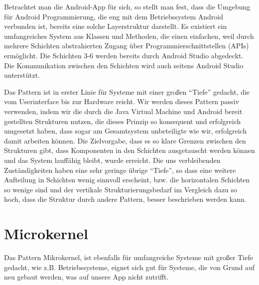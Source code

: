\documentclass{scrreprt}
\begin{document}
Betrachtet man die Android-App für sich, so stellt man fest, dass die Umgebung für Android Programmierung, die eng mit dem Betriebssystem Android verbunden ist, bereits eine solche Layerstruktur darstellt. Es existiert ein umfangreiches System aus Klassen und Methoden, die einen einfachen, weil durch mehrere Schichten abstrahierten Zugang über Programmierschnittstellen (APIs) ermöglicht. Die Schichten 3-6 werden bereits durch Android Studio abgedeckt. Die Kommunikation zwischen den Schichten wird auch seitens Android Studio unterstützt.

Das Pattern ist in erster Linie für Systeme mit einer großen “Tiefe” gedacht, die vom Userinterface bis zur Hardware reicht. Wir werden dieses Pattern passiv verwenden, indem wir die durch die Java Virtual Machine und Android bereit gestellten Strukturen nutzen, die dieses Prinzip so konsequent und erfolgreich umgesetzt haben, dass sogar am Gesamtsystem unbeteiligte wie wir, erfolgreich damit arbeiten können. Die Zielvorgabe, dass es so klare Grenzen zwischen den Strukturen gibt, dass Komponenten in den Schichten ausgetauscht werden können und das System lauffähig bleibt, wurde erreicht.
Die uns verbleibenden Zuständigkeiten haben eine sehr geringe übrige “Tiefe”, so dass eine weitere Aufteilung in Schichten wenig sinnvoll erscheint, bzw. die horizontalen Schichten so wenige sind und der vertikale Strukturierungsbedarf im Vergleich dazu so hoch, dass die Struktur durch andere Pattern, besser beschrieben werden kann.

\chapter{Microkernel}

Das Pattern Mikrokernel, ist ebenfalls für umfangreiche Systeme mit großer Tiefe gedacht, wie z.B. Betriebssysteme, eignet sich gut für Systeme, die von Grund auf neu gebaut werden, was auf unsere App nicht zutrifft.
\end{document}
